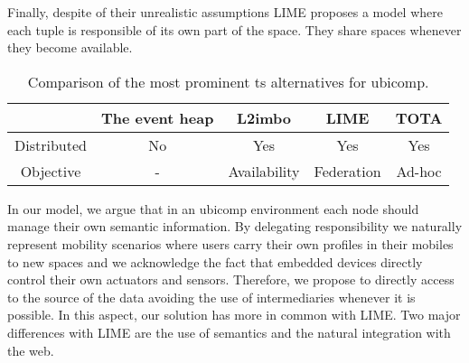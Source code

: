 Finally, despite of their unrealistic assumptions LIME proposes a model where each tuple is responsible of its own part of the space.
They share spaces whenever they become available.


\begin{table}%
  \centering
  \begin{tabular}{ c | c c c c }%
      ~ & The event heap & L2imbo & LIME & TOTA \\
      \hline
      Distributed & No & Yes & Yes & Yes \\
      Objective & - & Availability & Federation & Ad-hoc \\
  \end{tabular}
  \caption{Comparison of the most prominent \acl{ts} alternatives for \acl{ubicomp}.} %
  \label{tab:ubicomp_ts_comparison}
\end{table}


\medskip

In our model, we argue that in an \ac{ubicomp} environment each node should manage their own semantic information.
By delegating responsibility 
we naturally represent mobility scenarios where users carry their own profiles in their mobiles to new spaces 
and 
we acknowledge the fact that embedded devices directly control their own actuators and sensors.
Therefore, we propose to directly access to the source of the data avoiding the use of intermediaries whenever it is possible.
In this aspect, our solution has more in common with LIME.
Two major differences with LIME are the use of semantics and the natural integration with the web. %
